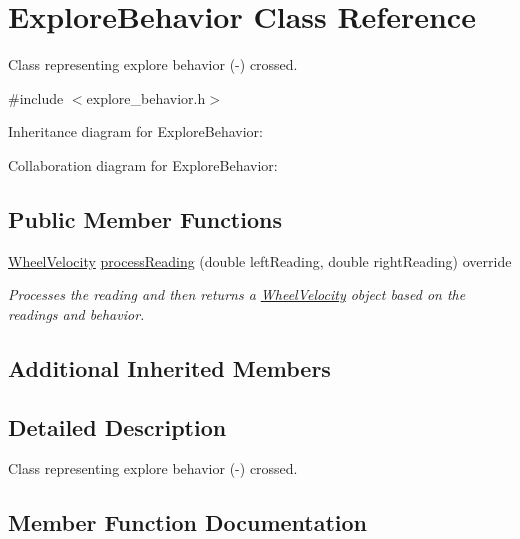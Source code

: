 \hypertarget{classExploreBehavior}{}\section{Explore\+Behavior Class Reference}
\label{classExploreBehavior}


Class representing explore behavior (-\/) crossed.  




{\ttfamily \#include $<$explore\+\_\+behavior.\+h$>$}



Inheritance diagram for Explore\+Behavior\+:


Collaboration diagram for Explore\+Behavior\+:
\subsection*{Public Member Functions}
\begin{DoxyCompactItemize}
\item 
\hyperlink{structWheelVelocity}{Wheel\+Velocity} \hyperlink{classExploreBehavior_a7c72e930db9c9b5f7972406312080948}{process\+Reading} (double left\+Reading, double right\+Reading) override
\begin{DoxyCompactList}\small\item\em Processes the reading and then returns a \hyperlink{structWheelVelocity}{Wheel\+Velocity} object based on the readings and behavior. \end{DoxyCompactList}\end{DoxyCompactItemize}
\subsection*{Additional Inherited Members}


\subsection{Detailed Description}
Class representing explore behavior (-\/) crossed. 

\subsection{Member Function Documentation}
